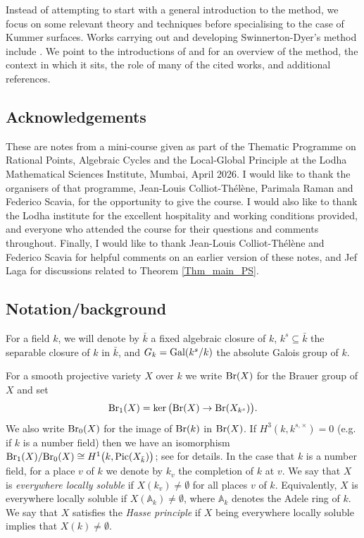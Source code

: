 \documentclass[10pt]{amsart}
\numberwithin{equation}{section}
\theoremstyle{remark}
\theoremstyle{definition}
\theoremstyle{definition}
\theoremstyle{definition}
\theoremstyle{definition}
\theoremstyle{definition}
\theoremstyle{definition}
\theoremstyle{definition}
\theoremstyle{definition}
\begin{document}
Instead of attempting to start with a general introduction to the method, we focus on some relevant theory and techniques before specialising to the case of Kummer surfaces. Works carrying out and developing Swinnerton-Dyer's method include \cite{SwinDyer1995,skoroswin98,SkoroSwinDyer2005,SwinDyer2000, SwinDyer2001,CT2001,witt07,HS16,Har19,MS24,mor2025}. We point to the introductions of \cite{CT2001} and \cite{Har19} for an overview of the method, the context in which it sits, the role of many of the  cited works, and additional references. 



\subsection{Acknowledgements}
These are notes from a mini-course given as part of the Thematic Programme on Rational Points, Algebraic Cycles and the Local-Global Principle at the Lodha Mathematical Sciences Institute, Mumbai, April 2026. I would like to thank the organisers of that programme, Jean-Louis Colliot-Thélène, Parimala Raman and Federico Scavia, for the opportunity to give the course. I would also like to thank the Lodha institute for the  excellent hospitality and working conditions provided, and everyone who attended the course for their questions and comments throughout. Finally, I would like to thank Jean-Louis Colliot-Thélène and Federico Scavia for helpful comments  on an earlier version  of these notes, and Jef Laga for  discussions related to Theorem \ref{Thm_main_PS}.

\subsection{Notation/background}
For a  field $k$, we will denote by $\bar{k}$ a fixed algebraic closure of $k$, $k^s\subseteq \bar{k}$ the separable closure of $k$ in $\bar{k}$, and $G_k=\textup{Gal}(k^s/k)$ the absolute Galois group of $k$. 

For a smooth projective variety $X$ over $k$ we write $\textup{Br}(X)$ for the Brauer group of $X$ and set
\[\textup{Br}_1(X)=\ker\big(\textup{Br}(X)\to \textup{Br}(X_{k^s})\big).\] 
We also write $\textup{Br}_0(X)$ for the image of $\textup{Br}(k)$ in $\textup{Br}(X)$. If $H^3(k,k^{s,\times})=0$ (e.g. if $k$ is a number field) then we have an isomorphism $\textup{Br}_1(X)/\textup{Br}_0(X)\cong H^1\big(k,\textup{Pic}(X_{\bar{k}})\big)$; see \cite[Proposition 4.3.2]{ctsko21} for details. In the case that $k$ is a number field, for a place $v$ of $k$ we denote by $k_v$ the completion of $k$ at $v$.  We say that $X$ is \textit{everywhere locally soluble} if $X(k_v)\neq \emptyset$ for all places $v$ of $k$. Equivalently, $X$ is everywhere locally soluble if $X(\mathbb{A}_k)\neq \emptyset$, where $\mathbb{A}_k$ denotes the Adele ring of $k$.  We say that $X$ satisfies the \textit{Hasse principle} if $X$ being everywhere locally soluble implies that $X(k)\neq \emptyset$. 
\end{document}
